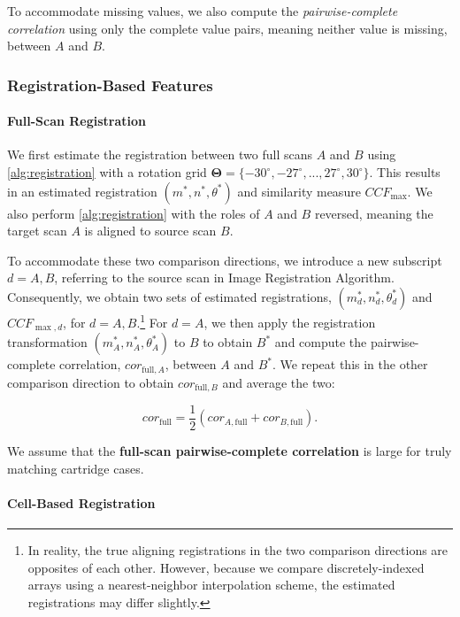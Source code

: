 \documentclass[preprint]{JASA}
\begin{document}
To accommodate missing values, we also compute the
\emph{pairwise-complete correlation} using only the complete value
pairs, meaning neither value is missing, between \(A\) and \(B\).

\hypertarget{registration-based-features}{%
\subsubsection{Registration-Based
Features}\label{registration-based-features}}

\hypertarget{full-scan-registration}{%
\paragraph{Full-Scan Registration}\label{full-scan-registration}}

We first estimate the registration between two full scans \(A\) and
\(B\) using \autoref{alg:registration} with a rotation grid
\(\pmb{\Theta} = \{-30^\circ, -27^\circ,...,27^\circ,30^\circ\}\). This
results in an estimated registration \((m^*,n^*,\theta^*)\) and
similarity measure \(CCF_{\max}\). We also perform
\autoref{alg:registration} with the roles of \(A\) and \(B\) reversed,
meaning the target scan \(A\) is aligned to source scan \(B\).

To accommodate these two comparison directions, we introduce a new
subscript \(d = A,B\), referring to the source scan in Image
Registration Algorithm. Consequently, we obtain two sets of estimated
registrations, \((m^*_d,n^*_d,\theta^*_d)\) and \(CCF_{\max,d}\), for
\(d=A,B\).\footnote{In reality, the true aligning registrations in the two comparison directions are opposites of each other. However, because we compare discretely-indexed arrays using a nearest-neighbor interpolation scheme, the estimated registrations may differ slightly.}
For \(d = A\), we then apply the registration transformation
\((m^*_A,n^*_A,\theta^*_A)\) to \(B\) to obtain \(B^*\) and compute the
pairwise-complete correlation, \(cor_{\text{full},A}\), between \(A\)
and \(B^*\). We repeat this in the other comparison direction to obtain
\(cor_{\text{full},B}\) and average the two:

\[
cor_{\text{full}} = \frac{1}{2}\left(cor_{A,\text{full}} + cor_{B,\text{full}}\right).
\]

We assume that the \textbf{full-scan pairwise-complete correlation} is
large for truly matching cartridge cases.

\hypertarget{cell-based-registration}{%
\paragraph{Cell-Based Registration}\label{cell-based-registration}}
\end{document}
